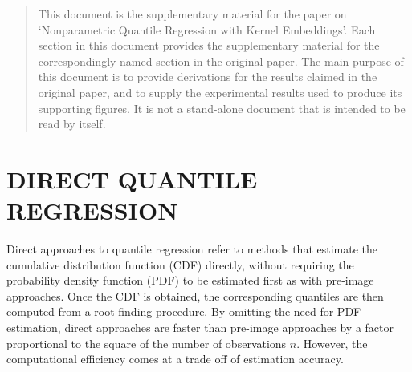 \documentclass[twoside]{article} \usepackage{aistats2017}
\theoremstyle{definition}
\theoremstyle{theorem}
\begin{document}
%

%


\begin{abstract}
	
	This document is the supplementary material for the paper on `Nonparametric Quantile Regression with Kernel Embeddings'. Each section in this document provides the supplementary material for the correspondingly named section in the original paper. The main purpose of this document is to provide derivations for the results claimed in the original paper, and to supply the experimental results used to produce its supporting figures. It is not a stand-alone document that is intended to be read by itself. 
	
\end{abstract}

\section{DIRECT QUANTILE REGRESSION}
\label{sec:direct_quantile_regression}

	Direct approaches to quantile regression refer to methods that estimate the cumulative distribution function (CDF) directly, without requiring the probability density function (PDF) to be estimated first as with pre-image approaches. Once the CDF is obtained, the corresponding quantiles are then computed from a root finding procedure. By omitting the need for PDF estimation, direct approaches are faster than pre-image approaches by a factor proportional to the square of the number of observations $n$. However, the computational efficiency comes at a trade off of estimation accuracy.
	
\end{document}
